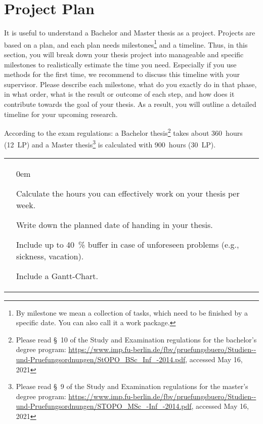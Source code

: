 \section{Project Plan}
\label{sec:plan}

It is useful to understand a Bachelor and Master thesis as a project. Projects are based on a plan, and each plan needs milestones\footnote{By milestone we mean a collection of tasks, which need to be finished by a specific date. You can also call it a work package.} and a timeline. Thus, in this section, you will break down your thesis project into manageable and specific milestones to realistically estimate the time you need. Especially if you use methods for the first time, we recommend to discuss this timeline with your supervisor. Please describe each milestone, what do you exactly do in that phase, in what order, what is the result or outcome of each step, and how does it contribute towards the goal of your thesis. As a result, you will outline a detailed timeline for your upcoming research.

According to the exam regulations: a Bachelor thesis\footnote{Please read \S~10 of the Study and Examination regulations for the bachelor’s degree program: \url{https://www.imp.fu-berlin.de/fbv/pruefungsbuero/Studien--und-Pruefungsordnungen/StOPO_BSc_Inf_-2014.pdf}, accessed May 16, 2021} takes about 360~hours (12~LP) and a Master thesis\footnote{Please read \S~9 of the Study and Examination regulations for the master’s
degree program: \url{https://www.imp.fu-berlin.de/fbv/pruefungsbuero/Studien--und-Pruefungsordnungen/STOPO_MSc_-Inf_-2014.pdf}, accessed May 16, 2021} is calculated with 900~hours (30~LP).

\begin{table}[h]
\small
\colorbox{usethiscolorhere}{
\centering
\begin{tabularx}{\textwidth}{@{} r Y @{}}
	& \begin{todolist}
  \itemsep0em %
  \item Calculate the hours you can effectively work on your thesis per week.
  \item Write down the planned date of handing in your thesis.
  \item Include up to 40~\% buffer in case of unforeseen problems (e.g., sickness, vacation).
  \item Include a Gantt-Chart.
\end{todolist}\\
    
\end{tabularx}
}
\end{table}




